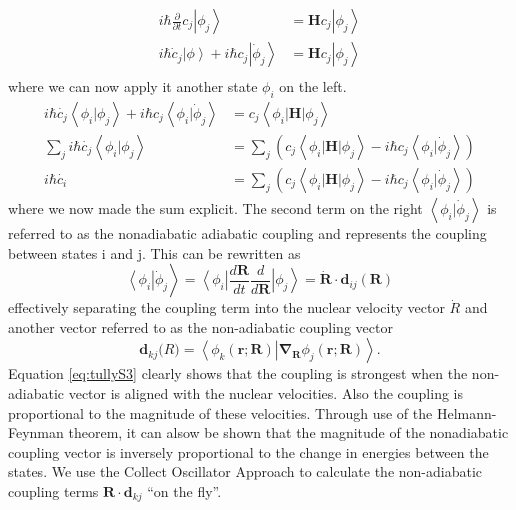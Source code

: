 \begin{align}
  i\hbar \frac{\partial}{\partial t} c_j \left | \phi _j \right> &= \mathbf{H} c_j \left | \phi_j \right>\\
  i\hbar \dot{c}_j \left | \phi \right> + i\hbar c_j \left| \dot{\phi}_j \right> &= \mathbf{H} c_j \left| \phi_j \right>\\
\end{align}
where we can now apply it another state \(\phi_i\) on the left.
\begin{align} \label{eq:dcoefficient}
  i\hbar \dot{c_j} \left< \phi_i | \phi_j \right> + i\hbar c_j \left< \phi_i | \dot{\phi}_j \right> &= c_j \left< \phi_i | \mathbf{H} | \phi_j \right>\\
  \sum_j i\hbar \dot{c_j} \left< \phi_i | \phi_j \right> &= \sum_j \left(c_j \left< \phi_i | \mathbf{H} | \phi_j \right> - i\hbar c_j \left< \phi_i | \dot{\phi}_j \right> \right)\\
  i\hbar \dot{c_i} &= \sum_j \left(c_j \left< \phi_i | \mathbf{H} | \phi_j \right> - i\hbar c_j \left< \phi_i | \dot{\phi}_j \right> \right)
\end{align}
where we now made the sum explicit.
The second term on the right \(\left< \phi_i | \dot{\phi}_j \right>\) is referred to as the nonadiabatic adiabatic coupling and represents the coupling between states i and j.
This can be rewritten as 
\begin{equation} \label{eq:tullyS3}
  \left<\phi_i\right|\dot{\phi}_j\left.\right>=\left<\phi_i\right|\frac{d\mathbf{R}}{dt}\frac{d}{d\mathbf{R}}\left|\phi_j\right>=\dot{\mathbf{R}}\cdot\mathbf{d}_{ij}(\mathbf{R})
\end{equation}
effectively separating the coupling term into the nuclear velocity vector \(\dot{R}\) and another vector referred to as the non-adiabatic coupling vector 
\begin{equation} \label{eq:tullynacoupling} 
  \mathbf{d}_{kj}\mathbf(R) =
  \left<\phi_{k}(\mathbf{r};\mathbf{R})\right|\mathbf{\nabla}_{\mathbf{R}}\left.\phi_j(\mathbf{r};\mathbf{R})\right>.
\end{equation}
Equation \ref{eq:tullyS3} clearly shows that the coupling is strongest when the non-adiabatic vector is aligned with the nuclear velocities.
Also the coupling is proportional to the magnitude of these velocities.
Through use of the Helmann-Feynman theorem, it can alsow be shown that the magnitude of the nonadiabatic coupling vector is inversely proportional to the change in energies between the states.
We use the Collect Oscillator Approach to calculate the non-adiabatic coupling terms \(\mathbf{R} \cdot \mathbf{d}_{kj}\) ``on the
fly''. \cite{tommasini2001electronic, tretiak1996collective, tretiak2009representation, chernyak2000density,Tretiak1996,Tretiak1999}

